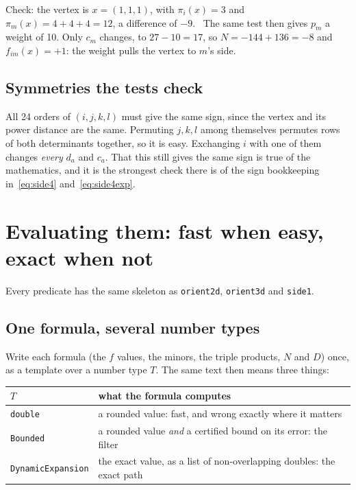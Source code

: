 \documentclass[11pt,a4paper]{article}
\newcommand{\code}[1]{\texttt{#1}}
\theoremstyle{remark}
\begin{document}
Check: the vertex is $x = (1,1,1)$, with $\pi_i(x) = 3$ and $\pi_m(x) = 4+4+4 = 12$, a
difference of $-9$. \checkmark\ The same test then gives $p_m$ a weight of 10. Only $c_m$ changes,
to $27 - 10 = 17$, so $N = -144 + 136 = -8$ and $f_{im}(x) = +1$: the weight pulls the vertex to
$m$'s side.

\subsection{Symmetries the tests check}

All 24 orders of $(i,j,k,l)$ must give the same sign, since the vertex and its power distance are
the same. Permuting $j, k, l$ among themselves permutes rows of both determinants together, so
it is easy. Exchanging $i$ with one of them changes \emph{every} $d_a$ and $c_a$. That this still
gives the same sign is true of the mathematics, and it is the strongest check there is of the
sign bookkeeping in~\eqref{eq:side4} and~\eqref{eq:side4exp}.

\section{Evaluating them: fast when easy, exact when not}\label{sec:eval}

Every predicate has the same skeleton as \code{orient2d}, \code{orient3d} and \code{side1}.

\subsection{One formula, several number types}

Write each formula (the $f$ values, the minors, the triple products, $N$ and $D$) once, as a
template over a number type $T$. The same text then means three things:

\begin{center}
\begin{tabularx}{\linewidth}{@{}l L@{}}
\toprule
$T$ & what the formula computes \\
\midrule
\code{double} & a rounded value: fast, and wrong exactly where it matters \\
\code{Bounded} & a rounded value \emph{and} a certified bound on its error: the filter \\
\code{DynamicExpansion} & the exact value, as a list of non-overlapping doubles: the exact path \\
\bottomrule
\end{tabularx}
\end{center}
\end{document}
